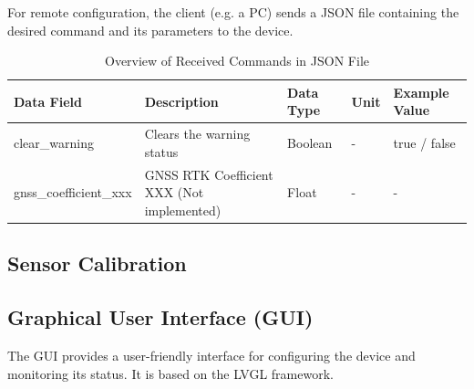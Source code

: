 For remote configuration, the client (e.g. a PC) sends a JSON file containing the desired command and its parameters to the device.

\begin{table}[h]
	\tiny
	\centering
	\begin{tabular}{|l|l|l|l|l|}
		\hline
		\textbf{Data Field}    & \textbf{Description}                       & \textbf{Data Type} & \textbf{Unit} & \textbf{Example Value} \\ \hline
		clear\_warning         & Clears the warning status                  & Boolean            & -             & true / false           \\ \hline
		gnss\_coefficient\_xxx & GNSS RTK Coefficient XXX (Not implemented) & Float              & -             & -                      \\ \hline
	\end{tabular}
	\caption{Overview of Received Commands in JSON File}
	\label{tab:received_commands}
\end{table}

\subsection{Sensor Calibration}


\clearpage
\subsection{Graphical User Interface (GUI)}
The GUI provides a user-friendly interface for configuring the device and monitoring its status.
It is based on the LVGL framework.



\clearpage
